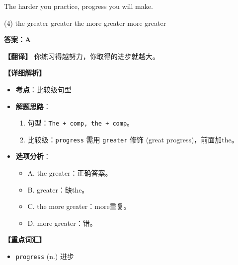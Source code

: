 \documentclass[11pt, a4paper]{article}
\newcommand{\analysis}[4]{
    \begin{solutionbox}
        \textbf{答案：#1}
        
        \textbf{【翻译】} #2
        
        \textbf{【详细解析】}
        #3
        
        \textbf{【重点词汇】}
        #4
    \end{solutionbox}
}
\newcommand{\blank}{\underline{\hspace{1.5cm}}}
\begin{document}
\begin{questions}
    \item The harder you practice, \blank progress you will make.
    \begin{tasks}(4)
        \task the greater \task greater \task the more greater \task more greater
    \end{tasks}
    \analysis{A}{你练习得越努力，你取得的进步就越大。}{
        \begin{itemize}
            \item \textbf{考点}：比较级句型
            \item \textbf{解题思路}：
                \begin{enumerate}
                    \item 句型：\texttt{The + comp, the + comp}。
                    \item 比较级：\texttt{progress} 需用 \texttt{greater} 修饰 (great progress)，前面加the。
                \end{enumerate}
            \item \textbf{选项分析}：
                \begin{itemize}
                    \item A. the greater：正确答案。
                    \item B. greater：缺the。
                    \item C. the more greater：more重复。
                    \item D. more greater：错。
                \end{itemize}
        \end{itemize}
    }{
        \begin{itemize}
            \item \texttt{progress} (n.) 进步
        \end{itemize}
    }


\end{questions}
\end{document}
